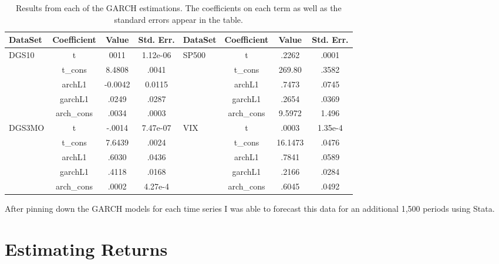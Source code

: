 \documentclass[a4paper, 11pt, twoside]{article}
\theoremstyle{definition} %
\numberwithin{equation}{section}
\begin{document}
    \begin{table}[h!]
      \begin{centering}
        \begin{tabular}{|l|c|cc||l|c|cc|}
        \hline
        \rowcolor{gray!45} DataSet & Coefficient &  Value&     Std. Err. & DataSet & Coefficient &   Value &     Std. Err. \\
        \hline
        \hline
        \rowcolor{gray!7} DGS10 & t & 0011  & 1.12e-06 & SP500 & t & .2262 & .0001 \\
        \rowcolor{gray!23} {} & t\_cons & 8.4808  & .0041 & {} & t\_cons & 269.80 & .3582 \\
        \rowcolor{gray!7} {} & archL1 & -0.0042 & 0.0115 & {} & archL1 & .7473 & .0745 \\
        \rowcolor{gray!23} {} & garchL1 & .0249  & .0287 & {} & garchL1 & .2654 & .0369\\
        \rowcolor{gray!7} {} & arch\_cons & .0034  & .0003 & {} & arch\_cons & 9.5972 &1.496 \\
        \rowcolor{gray!23} DGS3MO & t & -.0014  & 7.47e-07 & VIX & t & .0003 & 1.35e-4  \\
        \rowcolor{gray!7} {} & t\_cons & 7.6439  & .0024 & {} & t\_cons & 16.1473 & .0476 \\
        \rowcolor{gray!23} {} & archL1 & .6030  & .0436 & {} & archL1 & .7841 & .0589 \\
        \rowcolor{gray!7} {} & garchL1 & .4118  & .0168 & {} & garchL1 & .2166 & .0284 \\
        \rowcolor{gray!23} {} & arch\_cons & .0002  & 4.27e-4 & {} & arch\_cons & .6045 & .0492 \\
        \bottomrule
        \end{tabular}
        \captionsetup{width=5.5in}
        \caption{Results from each of the GARCH estimations. The coefficients on each term as well as the standard errors appear in the table.}
        \label{tab:garchsum}
      \end{centering}
    \end{table}

    After pinning down the GARCH models for each time series I was able to forecast this data for an additional 1,500 periods using Stata.

\newpage
\section{Estimating Returns} \label{sec:estimatingreturns}
\end{document}
